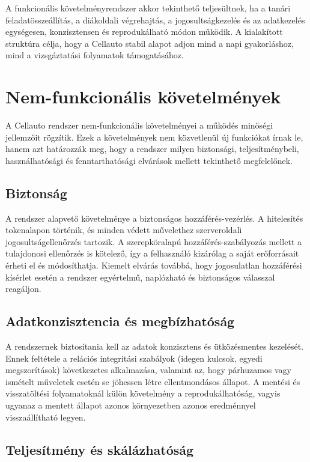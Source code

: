 \documentclass{thesis-ekf}
\begin{document}
A funkcionális követelményrendszer akkor tekinthető teljesültnek, ha a tanári feladatösszeállítás, a diákoldali végrehajtás, a jogosultságkezelés és az adatkezelés egységesen, konzisztensen és reprodukálható módon működik. A kialakított struktúra célja, hogy a Cellauto stabil alapot adjon mind a napi gyakorláshoz, mind a vizsgáztatási folyamatok támogatásához.

\section{Nem-funkcionális követelmények}
A Cellauto rendszer nem-funkcionális követelményei a működés minőségi jellemzőit rögzítik. Ezek a követelmények nem közvetlenül új funkciókat írnak le, hanem azt határozzák meg, hogy a rendszer milyen biztonsági, teljesítménybeli, használhatósági és fenntarthatósági elvárások mellett tekinthető megfelelőnek.

\subsection{Biztonság}

A rendszer alapvető követelménye a biztonságos hozzáférés-vezérlés. A hitelesítés tokenalapon történik, és minden védett művelethez szerveroldali jogosultságellenőrzés tartozik. A szerepköralapú hozzáférés-szabályozás mellett a tulajdonosi ellenőrzés is kötelező, így a felhasználó kizárólag a saját erőforrásait érheti el és módosíthatja. Kiemelt elvárás továbbá, hogy jogosulatlan hozzáférési kísérlet esetén a rendszer egyértelmű, naplózható és biztonságos válasszal reagáljon.

\subsection{Adatkonzisztencia és megbízhatóság}

A rendszernek biztosítania kell az adatok konzisztens és ütközésmentes kezelését. Ennek feltétele a relációs integritási szabályok (idegen kulcsok, egyedi megszorítások) következetes alkalmazása, valamint az, hogy párhuzamos vagy ismételt műveletek esetén se jöhessen létre ellentmondásos állapot. A mentési és visszatöltési folyamatoknál külön követelmény a reprodukálhatóság, vagyis ugyanaz a mentett állapot azonos környezetben azonos eredménnyel visszaállítható legyen.

\subsection{Teljesítmény és skálázhatóság}
\end{document}
